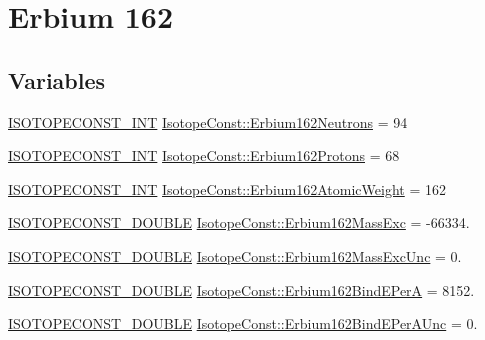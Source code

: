 \hypertarget{group___isotope_const-_erbium-_er162}{}\section{Erbium 162}
\label{group___isotope_const-_erbium-_er162}
\subsection*{Variables}
\begin{DoxyCompactItemize}
\item 
\mbox{\hyperlink{group___isotope_const-_macros_ga5f18360b3e99483a35c32d789e62621c}{I\+S\+O\+T\+O\+P\+E\+C\+O\+N\+S\+T\+\_\+\+I\+NT}} \mbox{\hyperlink{group___isotope_const-_erbium-_er162_gab9d3fde578f1aef556beb3719797b45d}{Isotope\+Const\+::\+Erbium162\+Neutrons}} = 94
\item 
\mbox{\hyperlink{group___isotope_const-_macros_ga5f18360b3e99483a35c32d789e62621c}{I\+S\+O\+T\+O\+P\+E\+C\+O\+N\+S\+T\+\_\+\+I\+NT}} \mbox{\hyperlink{group___isotope_const-_erbium-_er162_gae60d02d02ead44da46144072f9610975}{Isotope\+Const\+::\+Erbium162\+Protons}} = 68
\item 
\mbox{\hyperlink{group___isotope_const-_macros_ga5f18360b3e99483a35c32d789e62621c}{I\+S\+O\+T\+O\+P\+E\+C\+O\+N\+S\+T\+\_\+\+I\+NT}} \mbox{\hyperlink{group___isotope_const-_erbium-_er162_gaff0d570db7746d2c011dcb2c40459f57}{Isotope\+Const\+::\+Erbium162\+Atomic\+Weight}} = 162
\item 
\mbox{\hyperlink{group___isotope_const-_macros_ga8f45a7272ce02c0b4c65c44636ed719a}{I\+S\+O\+T\+O\+P\+E\+C\+O\+N\+S\+T\+\_\+\+D\+O\+U\+B\+LE}} \mbox{\hyperlink{group___isotope_const-_erbium-_er162_gaeec286f625eea60524ae6a159b431800}{Isotope\+Const\+::\+Erbium162\+Mass\+Exc}} = -\/66334.
\item 
\mbox{\hyperlink{group___isotope_const-_macros_ga8f45a7272ce02c0b4c65c44636ed719a}{I\+S\+O\+T\+O\+P\+E\+C\+O\+N\+S\+T\+\_\+\+D\+O\+U\+B\+LE}} \mbox{\hyperlink{group___isotope_const-_erbium-_er162_gab5e689c42b1be768a7a08909b84b5be2}{Isotope\+Const\+::\+Erbium162\+Mass\+Exc\+Unc}} = 0.
\item 
\mbox{\hyperlink{group___isotope_const-_macros_ga8f45a7272ce02c0b4c65c44636ed719a}{I\+S\+O\+T\+O\+P\+E\+C\+O\+N\+S\+T\+\_\+\+D\+O\+U\+B\+LE}} \mbox{\hyperlink{group___isotope_const-_erbium-_er162_ga0c2c4d7b0bb4e89f2f0c038cdde35d39}{Isotope\+Const\+::\+Erbium162\+Bind\+E\+PerA}} = 8152.
\item 
\mbox{\hyperlink{group___isotope_const-_macros_ga8f45a7272ce02c0b4c65c44636ed719a}{I\+S\+O\+T\+O\+P\+E\+C\+O\+N\+S\+T\+\_\+\+D\+O\+U\+B\+LE}} \mbox{\hyperlink{group___isotope_const-_erbium-_er162_gaebc7203e941617d3201007d3fa4914c1}{Isotope\+Const\+::\+Erbium162\+Bind\+E\+Per\+A\+Unc}} = 0.

\end{DoxyCompactItemize}
